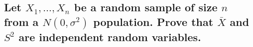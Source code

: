 \documentclass [12pt]{article}
\begin{document}
\begin{CJK*}{GBK}{kai}
		


  
\section{Let $X_1, \ldots, X_n$ be a random sample of size $n$ from a $N(0, \sigma^2)$ population. Prove that $\bar{X}$ and $S^2$ are independent random variables. }


  \end{CJK*}
\end{document}
